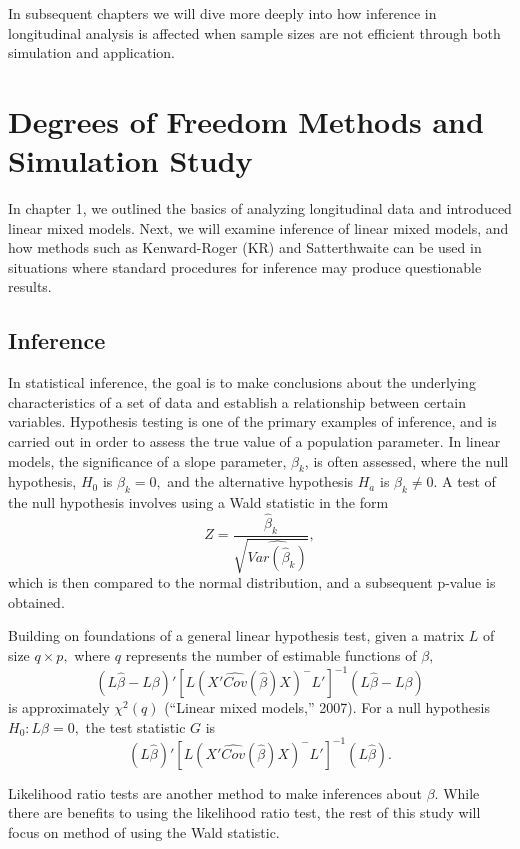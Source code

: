 \documentclass[12pt, twoside]{amherstthesis}
\begin{document}
In subsequent chapters we will dive more deeply into how inference in longitudinal analysis is affected when sample sizes are not efficient through both simulation and application.

\hypertarget{rmd-basics}{%
\chapter{Degrees of Freedom Methods and Simulation Study}\label{rmd-basics}}

In chapter 1, we outlined the basics of analyzing longitudinal data and introduced linear mixed models. Next, we will examine inference of linear mixed models, and how methods such as Kenward-Roger (KR) and Satterthwaite can be used in situations where standard procedures for inference may produce questionable results.

\hypertarget{inference}{%
\section{Inference}\label{inference}}

In statistical inference, the goal is to make conclusions about the underlying characteristics of a set of data and establish a relationship between certain variables. Hypothesis testing is one of the primary examples of inference, and is carried out in order to assess the true value of a population parameter. In linear models, the significance of a slope parameter, \(\beta_k\), is often assessed, where the null hypothesis, \(H_0\) is \(\beta_k = 0,\) and the alternative hypothesis \(H_a\) is \(\beta_k \neq 0.\) A test of the null hypothesis involves using a Wald statistic in the form \[ Z = \frac{\hat\beta_k}{\sqrt{\widehat{Var(\hat\beta_k)}}},\] which is then compared to the normal distribution, and a subsequent p-value is obtained.

Building on foundations of a general linear hypothesis test, given a matrix \(L\) of size \(q \times p,\) where \(q\) represents the number of estimable functions of \(\beta,\) \[(L\hat\beta-L\beta)'[L(X'\widehat {Cov}(\hat\beta)X)^-L']^{-1}(L\hat\beta-L\beta)
\] is approximately \(\chi^2(q)\) (``Linear mixed models,'' 2007). For a null hypothesis \(H_0: L\beta = 0,\) the test statistic \(G\) is \[(L\hat\beta)'[L(X'\widehat {Cov}(\hat\beta)X)^-L']^{-1}(L\hat\beta).\]

Likelihood ratio tests are another method to make inferences about \(\beta\). While there are benefits to using the likelihood ratio test, the rest of this study will focus on method of using the Wald statistic.
\end{document}
